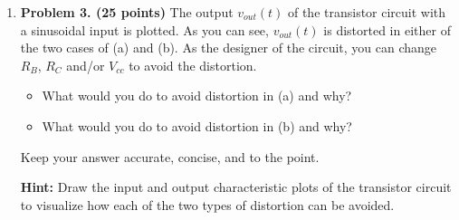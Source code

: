\begin{enumerate}

% 
 
 


\item {\bf Problem 3. (25 points)} 
The output $v_{out}(t)$ of the transistor circuit with a sinusoidal input
is plotted. As you can see, $v_{out}(t)$ is distorted in either of the two
cases of (a) and (b). As the designer of the circuit, you can change $R_B$,
$R_C$ and/or $V_{cc}$ to avoid the distortion. 


\begin{itemize}
\item What would you do to avoid distortion in (a) and why? 
\item What would you do to avoid distortion in (b) and why? 
\end{itemize}

Keep your answer accurate, concise, and to the point.


{\bf Hint:} Draw the input and output characteristic plots of the transistor
circuit to visualize how each of the two types of distortion can be avoided.

%



\end{enumerate}
